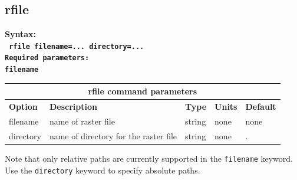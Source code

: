 \documentclass[11pt]{report}
\begin{document}
\subsection{rfile}
\label{keyword:rfile}
\begin{flushleft}\bf
Syntax:\\
\tt
rfile filename=... directory=...\\
\bf Required parameters:\\
\tt filename
\end{flushleft}
%
\begin{center}
\begin{tabular}{|l|p{8cm}|l|l||l|} \hline
\multicolumn{5}{|c|}{\bf rfile command parameters}\\ \hline
{\bf Option} & {\bf Description}                        & {\bf Type} & {\bf Units} & {\bf Default} \\ \hline 
\hline
filename      & name of raster file                     & string  & none & none \\ \hline
directory     & name of directory for the raster file   & string  & none & . \\ \hline
\end{tabular}
\end{center}
Note that only relative paths are currently supported in the \verb+filename+ keyword. Use the
\verb+directory+ keyword to specify absolute paths.


%
\end{document}
